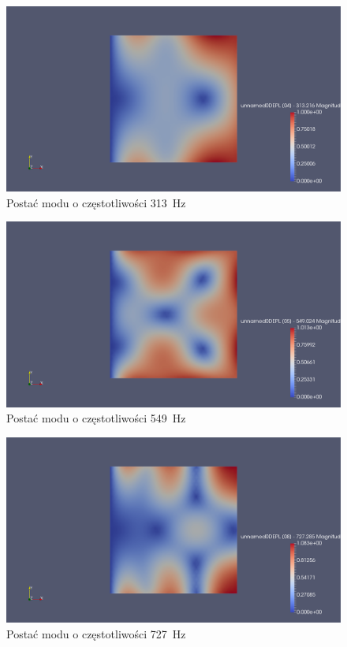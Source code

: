 \documentclass[polish,a4paper,11pt]{mwart}
\begin{document}
\begin{figure}[!tbh]
  \centering
  \includegraphics[width=\textwidth]{./plate_vib/313Hz.png}
  \caption{Postać modu o częstotliwości \SI{313}{\hertz}}
  \label{fig:mod2}
\end{figure}

\begin{figure}[!tbh]
  \centering
  \includegraphics[width=\textwidth]{./plate_vib/549Hz.png}
  \caption{Postać modu o częstotliwości \SI{549}{\hertz}}
  \label{fig:mod3}
\end{figure}

\begin{figure}[!tbh]
  \centering
  \includegraphics[width=\textwidth]{./plate_vib/727Hz.png}
  \caption{Postać modu o częstotliwości \SI{727}{\hertz}}
  \label{fig:mod4}
\end{figure}
\end{document}
